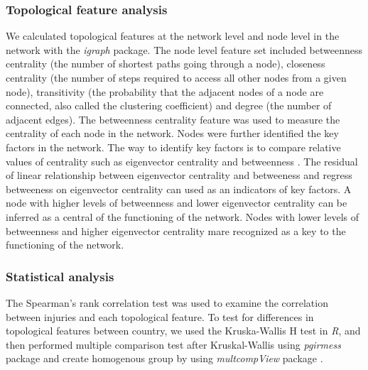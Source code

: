 \subsubsection{Topological feature analysis}

We calculated topological features at the network level and node level in the network with the \textit{igraph} package. The node level feature set included betweenness centrality (the number of shortest paths going through a node), closeness centrality (the number of steps required to access all other nodes from a given node), transitivity (the probability that the adjacent nodes of a node are connected, also called the clustering coefficient) and degree (the number of adjacent edges). The betweenness centrality feature was used to measure the centrality of each node in the network. Nodes were further identified the key factors in the network. The way to identify key factors is to compare relative values of centrality such as eigenvector centrality and betweenness \cite{Valente_2008_How}. The residual of linear relationship between eigenvector centrality and betweeness and regress betweeness on eigenvector centrality can used as an indicators of key factors. A node with higher levels of betweenness and lower eigenvector centrality can be inferred as a central of the functioning of the network. Nodes with lower levels of betweenness and higher eigenvector centrality mare recognized as a key to the functioning of the network. 
 
\subsubsection{Statistical analysis}
The Spearman’s rank correlation test was used to examine the correlation between injuries and each topological feature.  To test for differences in topological features between country, we used the Kruska-Wallis H test in \textit{R}, and then performed multiple comparison test after Kruskal-Wallis using \textit{pgirmess} package \citep{Giraudoux_2012_pgirmess} and create homogenous group by using \textit{multcompView} package \citep{Spencer_2015_multcompView}.


